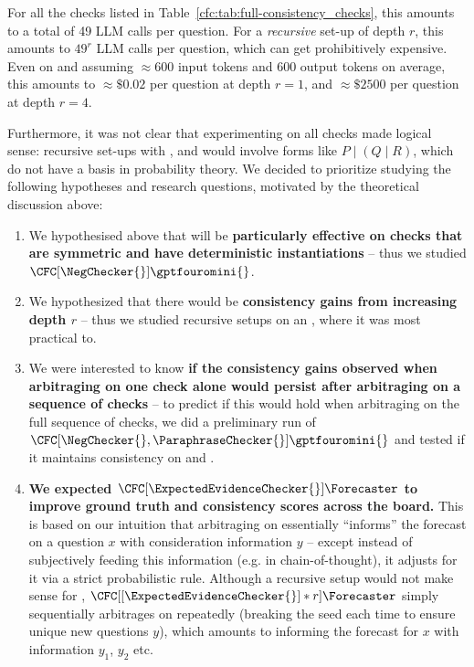 For all the checks listed in Table~\ref{cfc:tab:full-consistency_checks}, this amounts to a total of 49 LLM calls per question. For a \emph{recursive} \CFCaster{} set-up of depth $r$, this amounts to $49^r$ LLM calls per question, which can get prohibitively expensive. Even on \gptfouromini{} and assuming $\approx 600$ input tokens and 600 output tokens on average, this amounts to $\approx\$0.02$ per question at depth $r=1$, and $\approx\$2500$ per question at depth $r=4$.

Furthermore, it was not clear that experimenting on all checks made logical sense: recursive \CFCaster{} set-ups with \CondChecker{}, \CondCondChecker{} and \ExpectedEvidenceChecker{} would involve forms like $P\mid(Q\mid R)$, which do not have a basis in probability theory. We decided to prioritize studying the following hypotheses and research questions, motivated by the theoretical discussion above:

\begin{enumerate}
    \item We hypothesised above that \CFCaster{} will be \textbf{particularly effective on checks that are symmetric and have deterministic instantiations} -- thus we studied $\CFC[\NegChecker{}]{\gptfouromini{}}$.
    \item We hypothesized that there would be \textbf{consistency gains from increasing depth $r$} -- thus we studied recursive \CFCaster{} setups on \NegChecker{} an \ParaphraseChecker{}, where it was most practical to.
    \item We were interested to know \textbf{if the consistency gains observed when arbitraging on one check alone would persist after arbitraging on a sequence of checks} -- to predict if this would hold when arbitraging on the full sequence of checks, we did a preliminary run of $\CFC[\NegChecker{},\ParaphraseChecker{}]{\gptfouromini{}}$ and tested if it maintains consistency on \NegChecker{} and \ParaphraseChecker{}.
    \item \textbf{We expected $\CFC[\ExpectedEvidenceChecker{}]{\Forecaster}$ to improve ground truth and consistency scores across the board.} This is based on our intuition that arbitraging on \ExpectedEvidenceChecker{} essentially ``informs'' the forecast on a question $x$ with consideration information $y$ -- except instead of subjectively feeding this information (e.g. in chain-of-thought), it adjusts for it via a strict probabilistic rule. Although a recursive setup would not make sense for \ExpectedEvidenceChecker{}, $\CFC[[\ExpectedEvidenceChecker{}]*r]{\Forecaster}$ simply sequentially arbitrages on \ExpectedEvidenceChecker{} repeatedly (breaking the seed each time to ensure unique new questions $y$), which amounts to informing the forecast for $x$ with information $y_1$, $y_2$ etc.
\end{enumerate}

